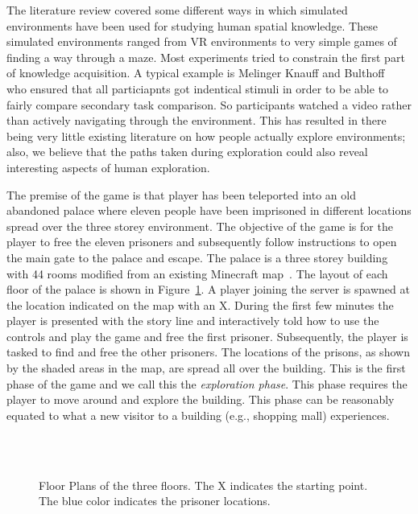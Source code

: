 The literature review covered some different ways in which simulated environments have been used for studying human spatial knowledge. These simulated environments ranged from VR environments to very simple games of finding a way through a maze. Most experiments tried to constrain the first part of knowledge acquisition. A typical example is Melinger Knauff and Bulthoff~\cite{meilinger2008working} who ensured that all particiapnts got indentical stimuli in order to be able to fairly compare secondary task comparison. So participants watched a video rather than actively navigating through the environment. This has resulted in there being very little existing literature on how people actually explore environments; also, we believe that the paths taken during exploration could also reveal interesting aspects of human exploration.


The premise of the game is that player has been teleported into an old abandoned palace where eleven people have been imprisoned in different locations spread over the three storey environment. The objective of the game is for the player to free the eleven prisoners and subsequently follow instructions to open the main gate to the palace and escape. The palace is a three storey building with 44 rooms modified from an existing Minecraft map~\cite{RoyalPalaceMap}. The layout of each floor of the palace is shown in Figure~\ref{fig:FloorPlans}. A player joining the server is spawned at the location indicated on the map with an X. During the first few minutes the player is presented with the story line and interactively told how to use the controls and play the game and free the first prisoner. Subsequently, the player is tasked to find and free the other prisoners. The locations of the prisons, as shown by the shaded areas in the map, are spread all over the building. This is the first phase of the game and we call this the \emph{exploration phase}. This phase requires the player to move around and explore the building. This phase can be reasonably equated to what a new visitor to a building (e.g., shopping mall) experiences.



\begin{figure}[!tb]
  \centering
   \\
  \\
  \caption{Floor Plans of the three floors. The X indicates the starting point. The blue color indicates the prisoner locations.}
  \label{fig:FloorPlans}
\end{figure}



